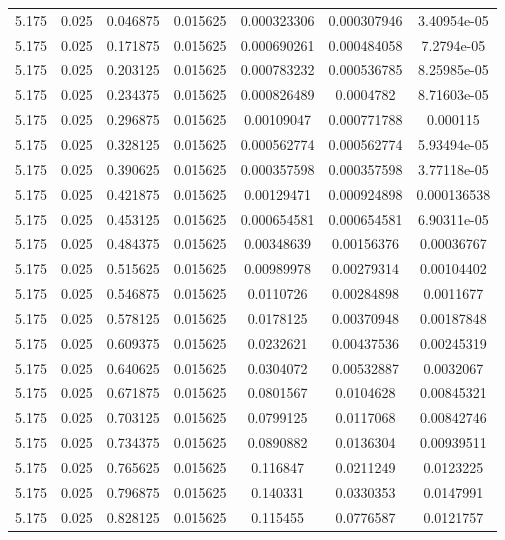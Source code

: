 \begin{table}[bh]
\begin{center}
{\begin{tabular}{ccccccc}
5.175	 & 0.025 & 	0.046875	 & 0.015625	 & 0.000323306	 & 0.000307946	 & 3.40954e-05 \\ 
5.175	 & 0.025 & 	0.171875	 & 0.015625	 & 0.000690261	 & 0.000484058	 & 7.2794e-05 \\ 
5.175	 & 0.025 & 	0.203125	 & 0.015625	 & 0.000783232	 & 0.000536785	 & 8.25985e-05 \\ 
5.175	 & 0.025 & 	0.234375	 & 0.015625	 & 0.000826489	 & 0.0004782	 & 8.71603e-05 \\ 
5.175	 & 0.025 & 	0.296875	 & 0.015625	 & 0.00109047	 & 0.000771788	 & 0.000115 \\ 
5.175	 & 0.025 & 	0.328125	 & 0.015625	 & 0.000562774	 & 0.000562774	 & 5.93494e-05 \\ 
5.175	 & 0.025 & 	0.390625	 & 0.015625	 & 0.000357598	 & 0.000357598	 & 3.77118e-05 \\ 
5.175	 & 0.025 & 	0.421875	 & 0.015625	 & 0.00129471	 & 0.000924898	 & 0.000136538 \\ 
5.175	 & 0.025 & 	0.453125	 & 0.015625	 & 0.000654581	 & 0.000654581	 & 6.90311e-05 \\ 
5.175	 & 0.025 & 	0.484375	 & 0.015625	 & 0.00348639	 & 0.00156376	 & 0.00036767 \\ 
5.175	 & 0.025 & 	0.515625	 & 0.015625	 & 0.00989978	 & 0.00279314	 & 0.00104402 \\ 
5.175	 & 0.025 & 	0.546875	 & 0.015625	 & 0.0110726	 & 0.00284898	 & 0.0011677 \\ 
5.175	 & 0.025 & 	0.578125	 & 0.015625	 & 0.0178125	 & 0.00370948	 & 0.00187848 \\ 
5.175	 & 0.025 & 	0.609375	 & 0.015625	 & 0.0232621	 & 0.00437536	 & 0.00245319 \\ 
5.175	 & 0.025 & 	0.640625	 & 0.015625	 & 0.0304072	 & 0.00532887	 & 0.0032067 \\ 
5.175	 & 0.025 & 	0.671875	 & 0.015625	 & 0.0801567	 & 0.0104628	 & 0.00845321 \\ 
5.175	 & 0.025 & 	0.703125	 & 0.015625	 & 0.0799125	 & 0.0117068	 & 0.00842746 \\ 
5.175	 & 0.025 & 	0.734375	 & 0.015625	 & 0.0890882	 & 0.0136304	 & 0.00939511 \\ 
5.175	 & 0.025 & 	0.765625	 & 0.015625	 & 0.116847	 & 0.0211249	 & 0.0123225 \\ 
5.175	 & 0.025 & 	0.796875	 & 0.015625	 & 0.140331	 & 0.0330353	 & 0.0147991 \\ 
5.175	 & 0.025 & 	0.828125	 & 0.015625	 & 0.115455	 & 0.0776587	 & 0.0121757 \\ 

\end{tabular}}
\end{center}
\end{table}
